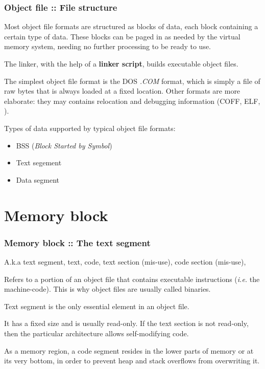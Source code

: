 
\begin{frame}
  \frametitle{Object file :: File structure}

Most object file
formats are structured as blocks of data, each block containing a
certain type of data. These blocks can be paged in as needed by the
virtual memory system, needing no further processing to be ready to use.

\-

The linker, with the help of a \textbf{linker script}, builds executable object files.

\-

The simplest object file format is the DOS \textit{.COM} format,
which is simply a file of raw bytes that is always loaded at a fixed
location. Other formats are more elaborate: they may contains relocation
and debugging information (COFF, ELF, \etc{}).

\-

Types of data supported by typical object file formats:

\begin{itemize}
    \item
	BSS (\textit{Block Started by Symbol}) 
    \item
	Text segement
    \item
	Data segment
   \end{itemize}

\end{frame}



%
%

\section{Memory block}


\begin{frame}
  \frametitle{Memory block :: The text segment}

A.k.a text segment, text, code, text section (mis-use), code section (mis-use), \etc{}

\-

Refers to a portion of an object file that contains executable instructions
(\textit{i.e.} the machine-code). This is why object files are usually called
binaries.

\-

Text segment is the only essential element in an object file.

\-

It has a fixed size and is usually read-only. If the text section is
not read-only, then the particular architecture allows self-modifying
code.

\-

As a memory region, a code segment resides in the lower parts of
memory or at its very bottom, in order to prevent heap and stack
overflows from overwriting it.

\end{frame}

